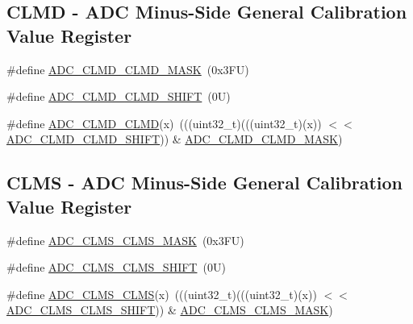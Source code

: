 \subsection*{C\+L\+MD -\/ A\+DC Minus-\/\+Side General Calibration Value Register}
\begin{DoxyCompactItemize}
\item 
\#define \mbox{\hyperlink{group___a_d_c___register___masks_ga45c4117ad9fba213c3d338cf6280cb75}{A\+D\+C\+\_\+\+C\+L\+M\+D\+\_\+\+C\+L\+M\+D\+\_\+\+M\+A\+SK}}~(0x3\+F\+U)
\item 
\#define \mbox{\hyperlink{group___a_d_c___register___masks_ga872bf108b50c6dd439ddc1294f104fe5}{A\+D\+C\+\_\+\+C\+L\+M\+D\+\_\+\+C\+L\+M\+D\+\_\+\+S\+H\+I\+FT}}~(0\+U)
\item 
\#define \mbox{\hyperlink{group___a_d_c___register___masks_ga8066beb7ed493b4d9964fffd3cdefd7a}{A\+D\+C\+\_\+\+C\+L\+M\+D\+\_\+\+C\+L\+MD}}(x)~(((uint32\+\_\+t)(((uint32\+\_\+t)(x)) $<$$<$ \mbox{\hyperlink{group___a_d_c___register___masks_ga872bf108b50c6dd439ddc1294f104fe5}{A\+D\+C\+\_\+\+C\+L\+M\+D\+\_\+\+C\+L\+M\+D\+\_\+\+S\+H\+I\+FT}})) \& \mbox{\hyperlink{group___a_d_c___register___masks_ga45c4117ad9fba213c3d338cf6280cb75}{A\+D\+C\+\_\+\+C\+L\+M\+D\+\_\+\+C\+L\+M\+D\+\_\+\+M\+A\+SK}})
\end{DoxyCompactItemize}
\subsection*{C\+L\+MS -\/ A\+DC Minus-\/\+Side General Calibration Value Register}
\begin{DoxyCompactItemize}
\item 
\#define \mbox{\hyperlink{group___a_d_c___register___masks_ga108adc09b24001dddfd498e14213fea6}{A\+D\+C\+\_\+\+C\+L\+M\+S\+\_\+\+C\+L\+M\+S\+\_\+\+M\+A\+SK}}~(0x3\+F\+U)
\item 
\#define \mbox{\hyperlink{group___a_d_c___register___masks_gabe0e92adb89c86d0523958a947288808}{A\+D\+C\+\_\+\+C\+L\+M\+S\+\_\+\+C\+L\+M\+S\+\_\+\+S\+H\+I\+FT}}~(0\+U)
\item 
\#define \mbox{\hyperlink{group___a_d_c___register___masks_ga83a90dcd2d54b25cc64ad18d6b9d4f07}{A\+D\+C\+\_\+\+C\+L\+M\+S\+\_\+\+C\+L\+MS}}(x)~(((uint32\+\_\+t)(((uint32\+\_\+t)(x)) $<$$<$ \mbox{\hyperlink{group___a_d_c___register___masks_gabe0e92adb89c86d0523958a947288808}{A\+D\+C\+\_\+\+C\+L\+M\+S\+\_\+\+C\+L\+M\+S\+\_\+\+S\+H\+I\+FT}})) \& \mbox{\hyperlink{group___a_d_c___register___masks_ga108adc09b24001dddfd498e14213fea6}{A\+D\+C\+\_\+\+C\+L\+M\+S\+\_\+\+C\+L\+M\+S\+\_\+\+M\+A\+SK}})
\end{DoxyCompactItemize}
